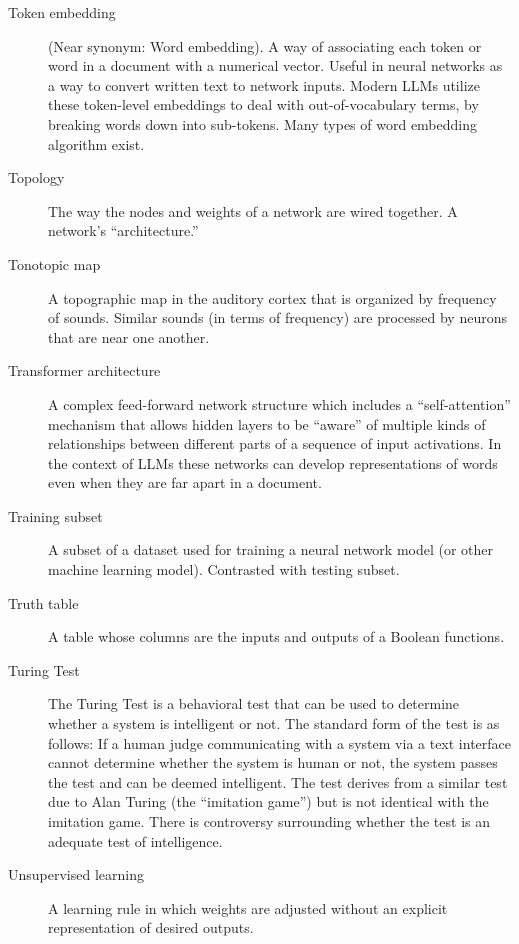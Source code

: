 \begin{description}
\item[Token embedding] (Near synonym: Word embedding). A way of associating each token or word in a document with a numerical vector. Useful in neural networks as a way to convert written text to network inputs. Modern LLMs utilize these token-level embeddings to deal with out-of-vocabulary terms, by breaking words down into sub-tokens. Many types of word embedding algorithm exist.

\item[Topology] The way the nodes and weights of a network are wired together. A network's ``architecture.''

\item[Tonotopic map] A topographic map in the auditory cortex that is organized by frequency of sounds. Similar sounds (in terms of frequency) are processed by neurons that are near one another.

\item[Transformer architecture] A complex feed-forward network structure which includes a ``self-attention'' mechanism that allows hidden layers to be ``aware'' of multiple kinds of relationships between different parts of a sequence of input activations. In the context of LLMs these networks can develop representations of words even when they are far apart in a document.

\item[Training subset] A subset of a dataset used for training a neural network model (or other machine learning model). Contrasted with testing subset.

\item[Truth table] A table whose columns are the inputs and outputs of a Boolean functions.

\item[Turing Test] The Turing Test is a behavioral test that can be used to determine whether a system is intelligent or not. The standard form of the test is as follows: If a human judge communicating with a system via a text interface cannot determine whether the system is human or not, the system passes the test and can be deemed intelligent.  The test derives from a similar test due to Alan Turing (the ``imitation game'') but is not identical with the imitation game. There is controversy surrounding whether the test is an adequate test of intelligence.

\item[Unsupervised learning] A learning rule in which weights are adjusted without an explicit representation of desired outputs.


\end{description}
